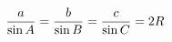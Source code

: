 \documentclass[preview]{standalone}
\begin{document}
\begin{align*}
\special{dvisvgm:raw <g id='unique000'>}\frac{a}{\sin A} = \frac{b}{\sin B} = \frac{c}{\sin C} = 2R\special{dvisvgm:raw </g>}
\end{align*}
\end{document}

